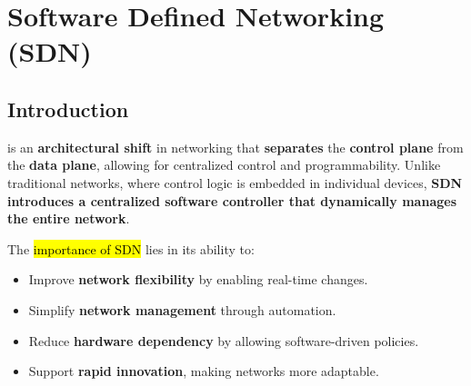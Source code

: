 \section{Software Defined Networking (SDN)}\label{section: Software Defined Networking (SDN)}

\subsection{Introduction}

 is an \textbf{architectural shift} in networking that \textbf{separates} the \textbf{control plane} from the \textbf{data plane}, allowing for centralized control and programmability. Unlike traditional networks, where control logic is embedded in individual devices, \textbf{SDN introduces a centralized software controller that dynamically manages the entire network}.  

\highspace
The \hl{importance of SDN} lies in its ability to:
\begin{itemize}
    \item Improve \textbf{network flexibility} by enabling real-time changes.
    \item Simplify \textbf{network management} through automation.
    \item Reduce \textbf{hardware dependency} by allowing software-driven policies.
    \item Support \textbf{rapid innovation}, making networks more adaptable.
\end{itemize}


